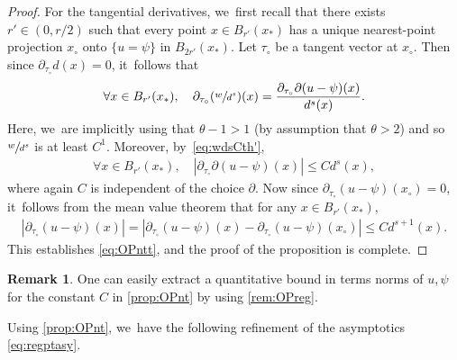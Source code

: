 \documentclass[10pt]{amsart}
\theoremstyle{plain}
\theoremstyle{definition}
\newtheorem{remark}[thm]{Remark}
\let\p\partial
\begin{document}
\begin{proof}
For the tangential derivatives, we~first recall that there exists $r'\in (0,r/2)$ such that every point $x\in B_{r'}(x_*)$ has a unique nearest-point projection $x_\circ$ onto $\{u=\psi\}$ in $B_{2r'}(x_*)$. Let $\tau_\circ$ be a tangent vector at $x_\circ$. Then since $\p_{\tau_\circ}d (x) = 0$, it~follows that
\begin{align*}
\forall x\in B_{r'}(x_*), \quad \p_{\tau_\circ}(\sfrac{w}{d^s})(x) = \frac{\p_{\tau_\circ}\p(u-\psi)(x)}{d^s(x)}.
\end{align*}
Here, we~are implicitly using that $\theta-1>1$ (by assumption that $\theta>2$) and so $\sfrac{w}{d^s}$ is at least $C^1$. Moreover, by~\eqref{eq:wdsCth'},
\begin{align*}
\forall x\in B_{r'}(x_*), \quad |{\p_{\tau_\circ}\p(u-\psi)(x)}|\le C d^s(x),
\end{align*}
where again $C$ is independent of the choice $\p$. Now since $\p_{\tau_\circ}(u-\psi)(x_\circ)=0$, it~follows from the mean value theorem that for any $x\in B_{r'}(x_*)$,
\begin{align*}
|\p_{\tau_\circ}(u-\psi)(x)| = |\p_{\tau_\circ}(u-\psi)(x) - \p_{\tau_\circ}(u-\psi)(x_\circ)| \le Cd^{s+1}(x).
\end{align*}
This establishes \eqref{eq:OPntt}, and the proof of the proposition is complete.
\end{proof}

\begin{remark}
One can easily extract a quantitative bound in terms norms of $u,\psi$ for the constant $C$ in \cref{prop:OPnt} by using \cref{rem:OPreg}.
\end{remark}

Using \cref{prop:OPnt}, we~have the following refinement of the asymptotics \eqref{eq:regptasy}.
\end{document}

